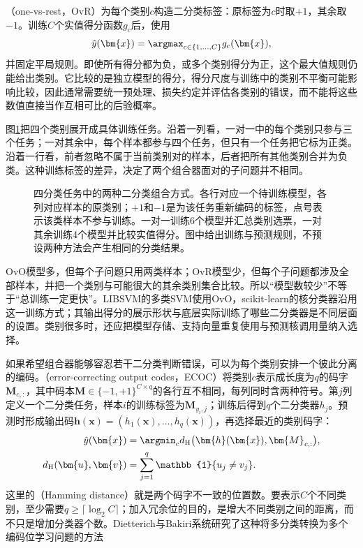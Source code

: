 （one-vs-rest，OvR）为每个类别$c$构造二分类标签：原标签为$c$时取$+1$，其余取$-1$。训练$C$个实值得分函数$g_c$后，使用
\[
  \hat y(\bm{x})=\argmax_{c\in\{1,\ldots,C\}}g_c(\bm{x}),
\]
并固定平局规则。即使所有得分都为负，或多个类别得分为正，这个最大值规则仍能给出类别。它比较的是独立模型的得分，得分尺度与训练中的类别不平衡可能影响比较，因此通常需要统一预处理、损失约定并评估各类别的错误，而不能将这些数值直接当作互相可比的后验概率。

图\ref{fig:classification-svm-multiclass}把四个类别展开成具体训练任务。沿着一列看，一对一中的每个类别只参与三个任务；一对其余中，每个样本都参与四个任务，但只有一个任务把它标为正类。沿着一行看，前者忽略不属于当前类别对的样本，后者把所有其他类别合并为负类。这种训练标签的差异，决定了两个组合器面对的子问题并不相同。

\begin{figure}[htbp]
  \centering
  
  \caption{四分类任务中的两种二分类组合方式。各行对应一个待训练模型，各列对应样本的原类别；$+1$和$-1$是为该任务重新编码的标签，点号表示该类样本不参与训练。一对一训练6个模型并汇总类别选票，一对其余训练4个模型并比较实值得分。图中给出训练与预测规则，不预设两种方法会产生相同的分类结果。}
  \label{fig:classification-svm-multiclass}
\end{figure}

OvO模型多，但每个子问题只用两类样本；OvR模型少，但每个子问题都涉及全部样本，并把一个类别与可能很大的其余类别集合比较。所以“模型数较少”不等于“总训练一定更快”。LIBSVM的多类SVM使用OvO，scikit-learn的核分类器沿用这一训练方式；其输出得分的展示形状与底层实际训练了哪些二分类器是不同层面的设置。类别很多时，还应把模型存储、支持向量重复使用与预测核调用量纳入选择。

如果希望组合器能够容忍若干二分类判断错误，可以为每个类别安排一个彼此分离的编码。（error-correcting output codes，ECOC）将类别$c$表示成长度为$q$的码字$\bm{M}_{c,:}$，其中码本$\bm{M}\in\{-1,+1\}^{C\times q}$的各行互不相同，每列同时含两种符号。第$j$列定义一个二分类任务，样本$i$的训练标签为$\bm{M}_{y_i,j}$；训练后得到$q$个二分类器$h_j$。预测时形成输出码$\bm{h}(\bm{x})=(h_1(\bm{x}),\ldots,h_q(\bm{x}))$，再选择最近的类别码字：
\begin{equation}
  \begin{aligned}
    \hat y(\bm{x})
      &=\argmin_c d_{\mathrm{H}}
          \bigl(\bm{h}(\bm{x}),\bm{M}_{c,:}\bigr),\\
    d_{\mathrm{H}}(\bm{u},\bm{v})
      &=\sum_{j=1}^q\mathbb{1}\{u_j\ne v_j\}.
  \end{aligned}
  \label{eq:classification-svm-ecoc}
\end{equation}
这里的（Hamming distance）就是两个码字不一致的位置数。要表示$C$个不同类别，至少需要$q\ge\lceil\log_2 C\rceil$；加入冗余位的目的，是增大不同类别之间的距离，而不只是增加分类器个数。Dietterich与Bakiri系统研究了这种将多分类转换为多个编码位学习问题的方法

